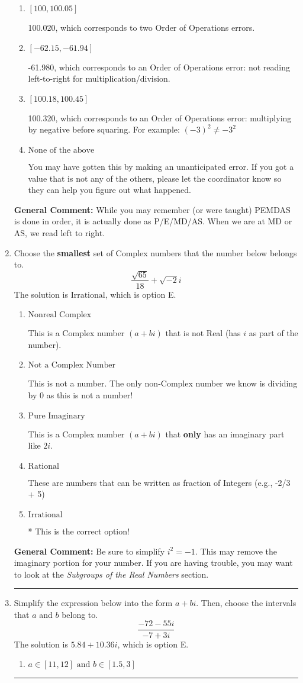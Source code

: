 \documentclass{extbook}[14pt]
\newcommand{\litem}[1]{\item #1

\rule{\textwidth}{0.4pt}}
\begin{document}
\begin{enumerate}
{\begin{enumerate}[label=\Alph*.]
* -61.680, this is the correct option
\item \( [100, 100.05] \)

 100.020, which corresponds to two Order of Operations errors.
\item \( [-62.15, -61.94] \)

 -61.980, which corresponds to an Order of Operations error: not reading left-to-right for multiplication/division.
\item \( [100.18, 100.45] \)

 100.320, which corresponds to an Order of Operations error: multiplying by negative before squaring. For example: $(-3)^2 \neq -3^2$
\item \( \text{None of the above} \)

 You may have gotten this by making an unanticipated error. If you got a value that is not any of the others, please let the coordinator know so they can help you figure out what happened.
\end{enumerate}

\textbf{General Comment:} While you may remember (or were taught) PEMDAS is done in order, it is actually done as P/E/MD/AS. When we are at MD or AS, we read left to right.
}
\litem{
Choose the \textbf{smallest} set of Complex numbers that the number below belongs to.
\[ \frac{\sqrt{65}}{18}+\sqrt{-2}i \]The solution is \( \text{Irrational} \), which is option E.\begin{enumerate}[label=\Alph*.]
\item \( \text{Nonreal Complex} \)

This is a Complex number $(a+bi)$ that is not Real (has $i$ as part of the number).
\item \( \text{Not a Complex Number} \)

This is not a number. The only non-Complex number we know is dividing by 0 as this is not a number!
\item \( \text{Pure Imaginary} \)

This is a Complex number $(a+bi)$ that \textbf{only} has an imaginary part like $2i$.
\item \( \text{Rational} \)

These are numbers that can be written as fraction of Integers (e.g., -2/3 + 5)
\item \( \text{Irrational} \)

* This is the correct option!
\end{enumerate}

\textbf{General Comment:} Be sure to simplify $i^2 = -1$. This may remove the imaginary portion for your number. If you are having trouble, you may want to look at the \textit{Subgroups of the Real Numbers} section.
}
\litem{
Simplify the expression below into the form $a+bi$. Then, choose the intervals that $a$ and $b$ belong to.
\[ \frac{-72 - 55 i}{-7 + 3 i} \]The solution is \( 5.84  + 10.36 i \), which is option E.\begin{enumerate}[label=\Alph*.]
\item \( a \in [11, 12] \text{ and } b \in [1.5, 3] \)


\end{enumerate}}
\end{enumerate}
\end{document}
